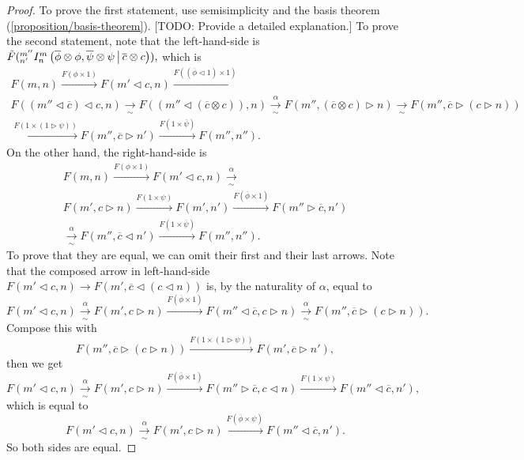 \begin{proof}
  To prove the first statement, use semisimplicity and the basis theorem
  (\ref{proposition/basis-theorem}). [TODO: Provide a detailed explanation.]
  To prove the second statement, note that the left-hand-side is
  $\tilde{F}({}^{m''}_{n'} I^{m}_{n} \left( \overline{\phi} \otimes \phi, \overline{\psi} \otimes \psi \,\middle|\, \overline{c} \otimes c \right)),$ which is
  \begin{multline*}
    F(m,n)
    \xrightarrow{F(\phi \times 1)}
    F(m' \lhd c, n)
    \xrightarrow{F((\overline{\phi} \lhd 1) \times 1)} \\
    F((m'' \lhd \overline{c}) \lhd c, n)
    \xrightarrow[\sim]{}
    F((m'' \lhd (\overline{c} \otimes c)), n)
    \xrightarrow[\sim]{\alpha}
    F(m'', (\overline{c} \otimes c) \rhd n)
    \xrightarrow[\sim]{}
    F(m'', \overline{c} \rhd (c \rhd n)) \\
    \xrightarrow{F(1 \times (1 \rhd \psi))}
    F(m'', \overline{c} \rhd n')
    \xrightarrow{F(1 \times \overline{\psi})}
    F(m'',n'').
  \end{multline*}
  On the other hand, the right-hand-side is
  \begin{multline*}
    F(m,n)
    \xrightarrow{F(\phi \times 1)}
    F(m' \lhd c, n)
    \xrightarrow[\sim]{\alpha} \\
    F(m', c \rhd n)
    \xrightarrow{F(1 \times \psi)}
    F(m', n')
    \xrightarrow{F(\overline{\phi} \times 1)}
    F(m'' \rhd \overline{c}, n') \\
    \xrightarrow[\sim]{\alpha}
    F(m'', \overline{c} \lhd n')
    \xrightarrow{F(1 \times \overline{\psi})}
    F(m'',n'').
  \end{multline*}
  To prove that they are equal, we can omit their first and their last arrows. Note that the composed arrow in left-hand-side $F(m' \lhd c, n) \to F(m', \overline{c} \lhd (c \lhd n))$ is, by the naturality of $\alpha$, equal to
  \[
    F(m' \lhd c, n)
    \xrightarrow[\sim]{\alpha}
    F(m', c \rhd n)
    \xrightarrow{F(\overline{\phi} \times 1)}
    F(m'' \lhd \overline{c}, c \rhd n)
    \xrightarrow[\sim]{\alpha}
    F(m'', \overline{c} \rhd (c \rhd n)).
  \]
  Compose this with
  \[
    F(m'', \overline{c} \rhd (c \rhd n))
    \xrightarrow{F(1 \times (1 \rhd \psi))}
    F(m', \overline{c} \rhd n'),
  \]
  then we get
  \[
    F(m' \lhd c, n)
    \xrightarrow[\sim]{\alpha}
    F(m', c \rhd n)
    \xrightarrow{F(\overline{\phi} \times 1)}
    F(m'' \rhd \overline{c}, c \lhd n)
    \xrightarrow{F(1 \times \psi)}
    F(m'' \lhd \overline{c}, n'),
  \]
  which is equal to
  \[
    F(m' \lhd c, n)
    \xrightarrow[\sim]{\alpha}
    F(m', c \rhd n)
    \xrightarrow{F(\overline{\phi} \times \psi)}
    F(m'' \lhd \overline{c}, n').
  \]
  So both sides are equal.
\end{proof}

